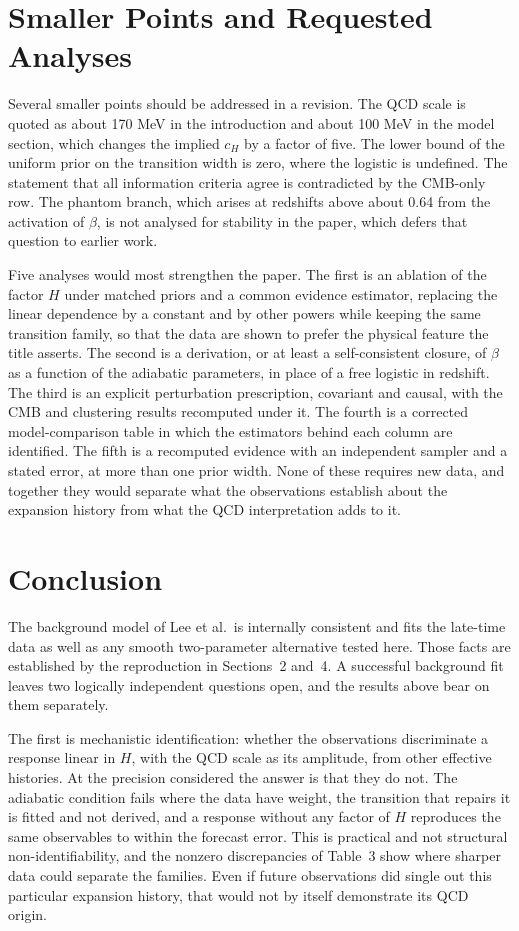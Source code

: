 \documentclass[11pt]{article}
\begin{document}
\section{Smaller Points and Requested Analyses}

Several smaller points should be addressed in a revision. The QCD scale is quoted as about 170 MeV in the introduction and about 100 MeV in the model section, which changes the implied $c_H$ by a factor of five. The lower bound of the uniform prior on the transition width is zero, where the logistic is undefined. The statement that all information criteria agree is contradicted by the CMB-only row. The phantom branch, which arises at redshifts above about 0.64 from the activation of $\beta$, is not analysed for stability in the paper, which defers that question to earlier work.

Five analyses would most strengthen the paper. The first is an ablation of the factor $H$ under matched priors and a common evidence estimator, replacing the linear dependence by a constant and by other powers while keeping the same transition family, so that the data are shown to prefer the physical feature the title asserts. The second is a derivation, or at least a self-consistent closure, of $\beta$ as a function of the adiabatic parameters, in place of a free logistic in redshift. The third is an explicit perturbation prescription, covariant and causal, with the CMB and clustering results recomputed under it. The fourth is a corrected model-comparison table in which the estimators behind each column are identified. The fifth is a recomputed evidence with an independent sampler and a stated error, at more than one prior width. None of these requires new data, and together they would separate what the observations establish about the expansion history from what the QCD interpretation adds to it.

\section{Conclusion}

The background model of Lee et al.\ is internally consistent and fits the late-time data as well as any smooth two-parameter alternative tested here. Those facts are established by the reproduction in Sections~2 and~4. A successful background fit leaves two logically independent questions open, and the results above bear on them separately.

The first is mechanistic identification: whether the observations discriminate a response linear in $H$, with the QCD scale as its amplitude, from other effective histories. At the precision considered the answer is that they do not. The adiabatic condition fails where the data have weight, the transition that repairs it is fitted and not derived, and a response without any factor of $H$ reproduces the same observables to within the forecast error. This is practical and not structural non-identifiability, and the nonzero discrepancies of Table~3 show where sharper data could separate the families. Even if future observations did single out this particular expansion history, that would not by itself demonstrate its QCD origin.
\end{document}
